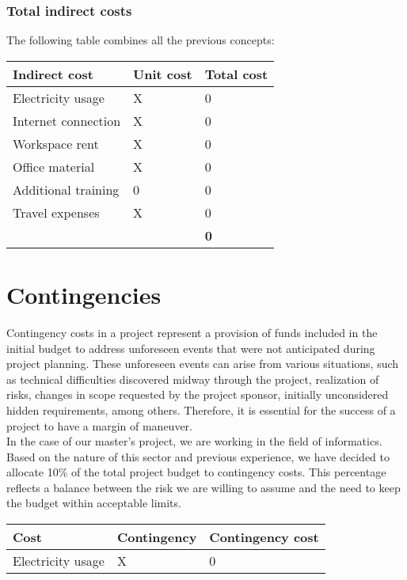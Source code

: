 \documentclass[../memory.tex]{subfiles}
\begin{document}
\subsubsection{Total indirect costs}
The following table combines all the previous concepts:
\\[12pt]
\begin{tabularx}{\textwidth}{|X|X|X|}
	\hline
	\rowcolor{rowColor}
	Indirect cost         & Unit cost           & Total cost \\
	\hline
	Electricity usage     & X                   & 0\texteuro \\
	\hline
	Internet connection   & X                   & 0\texteuro \\
	\hline
	Workspace rent        & X                   & 0\texteuro \\
	\hline
	Office material       & X                   & 0\texteuro \\
	\hline
	Additional training   & 0\texteuro          & 0\texteuro \\
	\hline
	Travel expenses       & X                   & 0\texteuro \\
	\hline
	\multicolumn{2}{X|}{} & \textbf{0\texteuro}              \\
	\cline{3-3}
\end{tabularx}
\section{Contingencies}
Contingency costs in a project represent a provision of funds included in the
initial budget to address unforeseen events that were not anticipated during
project planning. These unforeseen events can arise from various situations,
such as technical difficulties discovered midway through the project,
realization of risks, changes in scope requested by the project sponsor,
initially unconsidered hidden requirements, among others. Therefore, it is
essential for the success of a project to have a margin of maneuver.
\\
In the case of our master's project, we are working in the field of informatics.
Based on the nature of this sector and previous experience, we have decided to
allocate 10\% of the total project budget to contingency costs. This percentage
reflects a balance between the risk we are willing to assume and the need to
keep the budget within acceptable limits.
\\[12pt]
\begin{tabularx}{\textwidth}{|X|X|X|}
	\hline
	\rowcolor{rowColor}
	Cost              & Contingency & Contingency cost \\
	\hline
	Electricity usage & X           & 0\texteuro       \\
	\hline
\end{tabularx}
\end{document}
